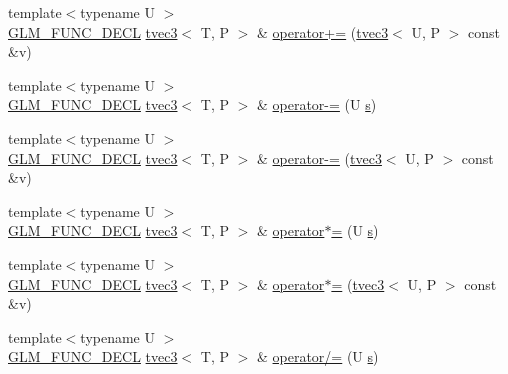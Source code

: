 \begin{DoxyCompactItemize}
\item 
{\footnotesize template$<$typename U $>$ }\\\hyperlink{setup_8hpp_ab2d052de21a70539923e9bcbf6e83a51}{G\+L\+M\+\_\+\+F\+U\+N\+C\+\_\+\+D\+E\+CL} \hyperlink{structglm_1_1detail_1_1tvec3}{tvec3}$<$ T, P $>$ \& \hyperlink{structglm_1_1detail_1_1tvec3_a9bd5c6f729076573c980b70cc16a429b}{operator+=} (\hyperlink{structglm_1_1detail_1_1tvec3}{tvec3}$<$ U, P $>$ const \&v)
\item 
{\footnotesize template$<$typename U $>$ }\\\hyperlink{setup_8hpp_ab2d052de21a70539923e9bcbf6e83a51}{G\+L\+M\+\_\+\+F\+U\+N\+C\+\_\+\+D\+E\+CL} \hyperlink{structglm_1_1detail_1_1tvec3}{tvec3}$<$ T, P $>$ \& \hyperlink{structglm_1_1detail_1_1tvec3_aafbf3f712a6add1677828784286ab62d}{operator-\/=} (U \hyperlink{structglm_1_1detail_1_1tvec3_aa7906d8cd1a54c96ba22c1f97ebaf7cc}{s})
\item 
{\footnotesize template$<$typename U $>$ }\\\hyperlink{setup_8hpp_ab2d052de21a70539923e9bcbf6e83a51}{G\+L\+M\+\_\+\+F\+U\+N\+C\+\_\+\+D\+E\+CL} \hyperlink{structglm_1_1detail_1_1tvec3}{tvec3}$<$ T, P $>$ \& \hyperlink{structglm_1_1detail_1_1tvec3_a9cb33db5b994eea9724fdd8c30b08873}{operator-\/=} (\hyperlink{structglm_1_1detail_1_1tvec3}{tvec3}$<$ U, P $>$ const \&v)
\item 
{\footnotesize template$<$typename U $>$ }\\\hyperlink{setup_8hpp_ab2d052de21a70539923e9bcbf6e83a51}{G\+L\+M\+\_\+\+F\+U\+N\+C\+\_\+\+D\+E\+CL} \hyperlink{structglm_1_1detail_1_1tvec3}{tvec3}$<$ T, P $>$ \& \hyperlink{structglm_1_1detail_1_1tvec3_a414982cd74a45512de204d72ea147c46}{operator$\ast$=} (U \hyperlink{structglm_1_1detail_1_1tvec3_aa7906d8cd1a54c96ba22c1f97ebaf7cc}{s})
\item 
{\footnotesize template$<$typename U $>$ }\\\hyperlink{setup_8hpp_ab2d052de21a70539923e9bcbf6e83a51}{G\+L\+M\+\_\+\+F\+U\+N\+C\+\_\+\+D\+E\+CL} \hyperlink{structglm_1_1detail_1_1tvec3}{tvec3}$<$ T, P $>$ \& \hyperlink{structglm_1_1detail_1_1tvec3_aac5ebc20b3a00cdd090b9320186b18c2}{operator$\ast$=} (\hyperlink{structglm_1_1detail_1_1tvec3}{tvec3}$<$ U, P $>$ const \&v)
\item 
{\footnotesize template$<$typename U $>$ }\\\hyperlink{setup_8hpp_ab2d052de21a70539923e9bcbf6e83a51}{G\+L\+M\+\_\+\+F\+U\+N\+C\+\_\+\+D\+E\+CL} \hyperlink{structglm_1_1detail_1_1tvec3}{tvec3}$<$ T, P $>$ \& \hyperlink{structglm_1_1detail_1_1tvec3_ab0e67902096b95132ded9191df59f483}{operator/=} (U \hyperlink{structglm_1_1detail_1_1tvec3_aa7906d8cd1a54c96ba22c1f97ebaf7cc}{s})

\end{DoxyCompactItemize}
